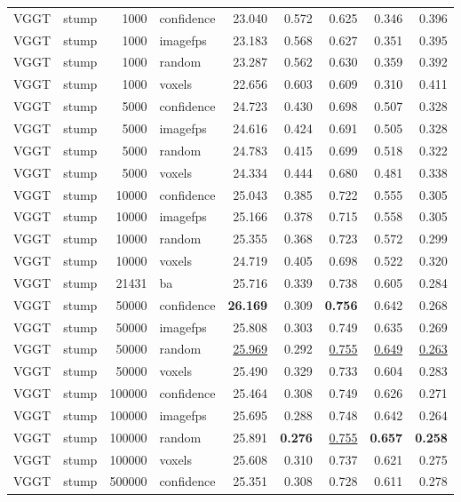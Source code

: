 \begin{table}[H]
\begin{tabular}{llrlrrrrr}
VGGT & stump & 1000 & confidence & 23.040 & 0.572 & 0.625 & 0.346 & 0.396 \\
VGGT & stump & 1000 & imagefps & 23.183 & 0.568 & 0.627 & 0.351 & 0.395 \\
VGGT & stump & 1000 & random & 23.287 & 0.562 & 0.630 & 0.359 & 0.392 \\
VGGT & stump & 1000 & voxels & 22.656 & 0.603 & 0.609 & 0.310 & 0.411 \\
VGGT & stump & 5000 & confidence & 24.723 & 0.430 & 0.698 & 0.507 & 0.328 \\
VGGT & stump & 5000 & imagefps & 24.616 & 0.424 & 0.691 & 0.505 & 0.328 \\
VGGT & stump & 5000 & random & 24.783 & 0.415 & 0.699 & 0.518 & 0.322 \\
VGGT & stump & 5000 & voxels & 24.334 & 0.444 & 0.680 & 0.481 & 0.338 \\
VGGT & stump & 10000 & confidence & 25.043 & 0.385 & 0.722 & 0.555 & 0.305 \\
VGGT & stump & 10000 & imagefps & 25.166 & 0.378 & 0.715 & 0.558 & 0.305 \\
VGGT & stump & 10000 & random & 25.355 & 0.368 & 0.723 & 0.572 & 0.299 \\
VGGT & stump & 10000 & voxels & 24.719 & 0.405 & 0.698 & 0.522 & 0.320 \\
VGGT & stump & 21431 & ba & 25.716 & 0.339 & 0.738 & 0.605 & 0.284 \\
VGGT & stump & 50000 & confidence & \textbf{26.169} & 0.309 & \textbf{0.756} & 0.642 & 0.268 \\
VGGT & stump & 50000 & imagefps & 25.808 & 0.303 & 0.749 & 0.635 & 0.269 \\
VGGT & stump & 50000 & random & \underline{25.969} & 0.292 & \underline{0.755} & \underline{0.649} & \underline{0.263} \\
VGGT & stump & 50000 & voxels & 25.490 & 0.329 & 0.733 & 0.604 & 0.283 \\
VGGT & stump & 100000 & confidence & 25.464 & 0.308 & 0.749 & 0.626 & 0.271 \\
VGGT & stump & 100000 & imagefps & 25.695 & 0.288 & 0.748 & 0.642 & 0.264 \\
VGGT & stump & 100000 & random & 25.891 & \textbf{0.276} & \underline{0.755} & \textbf{0.657} & \textbf{0.258} \\
VGGT & stump & 100000 & voxels & 25.608 & 0.310 & 0.737 & 0.621 & 0.275 \\
VGGT & stump & 500000 & confidence & 25.351 & 0.308 & 0.728 & 0.611 & 0.278 \\

\end{tabular}
\end{table}
